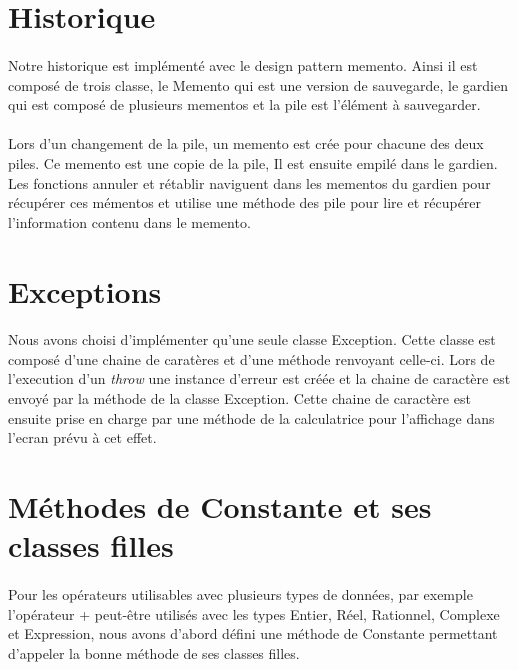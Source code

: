 \documentclass[a4paper,12pt]{report}
\begin{document}
	\section{Historique}
		\paragraph{}Notre historique est implémenté avec le design pattern memento. Ainsi il est composé de trois classe, le Memento qui est une version de sauvegarde, le gardien qui est composé de plusieurs mementos et la pile est l'élément à sauvegarder. 
		
		 \paragraph{}Lors d’un changement de la pile, un memento est crée pour chacune des deux piles. Ce memento est une copie de la pile, Il est ensuite empilé dans le gardien. Les fonctions annuler et rétablir naviguent dans les mementos du gardien pour récupérer ces mémentos et utilise une méthode des pile pour lire et récupérer l'information contenu dans le memento.
		 
	\section{Exceptions}
		\paragraph{}Nous avons choisi d'implémenter qu'une seule classe Exception. Cette classe est composé d'une chaine de caratères et d'une méthode renvoyant celle-ci. Lors de l'execution d'un \emph{throw} une instance d'erreur est créée et la chaine de caractère est envoyé par la méthode de la classe Exception. Cette chaine de caractère est ensuite prise en charge par une méthode de la calculatrice pour l'affichage dans l'ecran prévu à cet effet.
		
	\section{Méthodes de Constante et ses classes filles}
		\paragraph{}Pour les opérateurs utilisables avec plusieurs types de données, par exemple l'opérateur + peut-être utilisés avec les types Entier, Réel, Rationnel, Complexe et Expression, nous avons d'abord défini une méthode de Constante permettant d'appeler la bonne méthode de ses classes filles.
\end{document}
